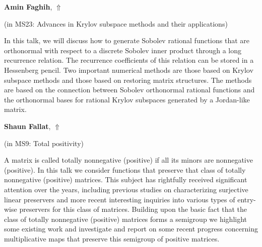 \documentclass[ILAS2025-program.tex]{subfiles}
\begin{document}
     \hypertarget{down0391}{}\begin{ilasabstract}
    
    \textbf{Amin Faghih},  \hfill \hyperlink{up0391}{$\Uparrow$}
    
    (in {\color{mstitle}MS23: Advances in Krylov subspace methods and their applications})
        
        \mtskip
    In this talk, we will discuss how to generate Sobolev rational functions that are orthonormal with respect to a discrete Sobolev inner product through a long recurrence relation. The recurrence coefficients of this relation can be stored in a Hessenberg pencil. Two important numerical methods are those based on Krylov subspace methods and those based on restoring matrix structures. The methods are based on the connection between Sobolev orthonormal rational functions and the orthonormal bases for rational Krylov subspaces generated by a Jordan-like matrix.\end{ilasabstract}
     \hypertarget{down0010}{}\begin{ilasabstract}
    
    \textbf{Shaun Fallat},  \hfill \hyperlink{up0010}{$\Uparrow$}
    
    (in {\color{mstitle}MS9: Total positivity})
        
        \mtskip
    A matrix is called totally nonnegative (positive) if all its minors are nonnegative (positive). In this talk we consider functions that preserve that class of totally nonnegative (positive) matrices. This subject has rightfully received significant attention over the years, including previous studies on characterizing surjective linear preservers and more recent interesting inquiries into various types of entry-wise preservers for this class of matrices. Building upon the basic fact that the class of totally nonnegative (positive) matrices forms a semigroup we highlight some existing work and investigate and report on some recent progress concerning multiplicative maps that preserve this semigroup of positive matrices.
\end{ilasabstract}
\end{document}
